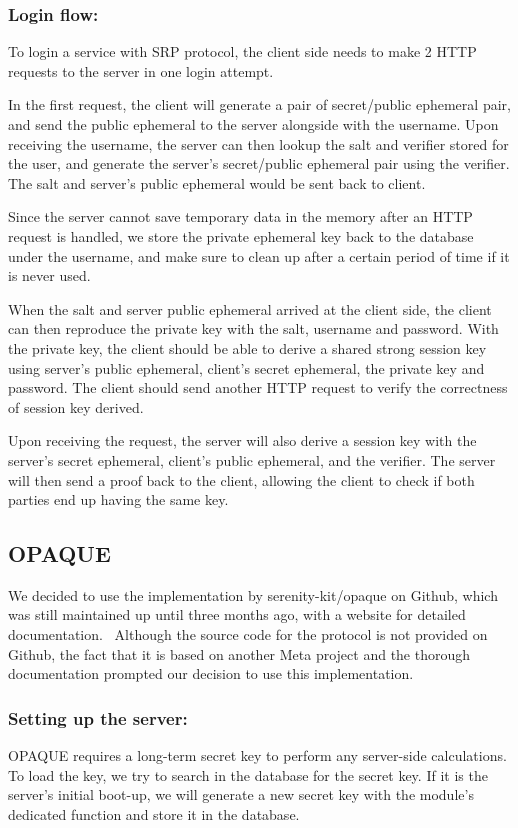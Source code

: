 \subsubsection{Login flow:}
To login a service with SRP protocol, the client side needs to make 2 HTTP requests to the server in one login attempt. 

In the first request, the client will generate a pair of secret/public ephemeral pair, and send the public ephemeral to the server alongside with the username.
Upon receiving the username, the server can then lookup the salt and verifier stored for the user, and generate the server's secret/public ephemeral pair using the verifier.
The salt and server's public ephemeral would be sent back to client.

Since the server cannot save temporary data in the memory after an HTTP request is handled, we store the private ephemeral key back to the database under the username, and make sure to clean up after a certain period of time if it is never used.

When the salt and server public ephemeral arrived at the client side, the client can then reproduce the private key with the salt, username and password.
With the private key, the client should be able to derive a shared strong session key using server's public ephemeral, client's secret ephemeral, the private key and password.
The client should send another HTTP request to verify the correctness of session key derived. 

Upon receiving the request, the server will also derive a session key with the server's secret ephemeral, client's public ephemeral, and the verifier.
The server will then send a proof back to the client, allowing the client to check if both parties end up having the same key.


\subsection{OPAQUE}
We decided to use the implementation by serenity-kit/opaque on Github, which was still maintained up until three months ago, with a website for detailed documentation.~\cite{OPAQUErepo}
Although the source code for the protocol is not provided on Github, the fact that it is based on another Meta project and the thorough documentation prompted our decision to use this implementation.

\subsubsection{Setting up the server:}
OPAQUE requires a long-term secret key to perform any server-side calculations.
To load the key, we try to search in the database for the secret key.
If it is the server's initial boot-up, we will generate a new secret key with the module's dedicated function and store it in the database.

